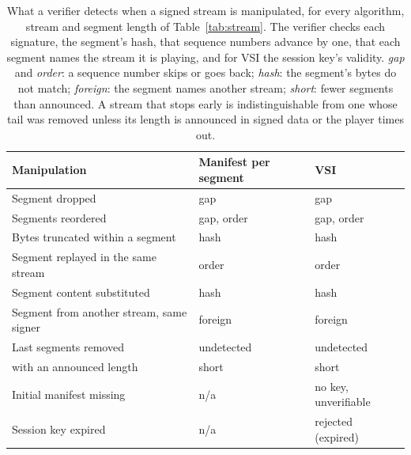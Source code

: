 \begin{table}[ht]
\caption{What a verifier detects when a signed stream is manipulated, for every algorithm, stream and segment length of Table~\ref{tab:stream}. The verifier checks each signature, the segment's hash, that sequence numbers advance by one, that each segment names the stream it is playing, and for VSI the session key's validity. \emph{gap} and \emph{order}: a sequence number skips or goes back; \emph{hash}: the segment's bytes do not match; \emph{foreign}: the segment names another stream; \emph{short}: fewer segments than announced. A stream that stops early is indistinguishable from one whose tail was removed unless its length is announced in signed data or the player times out.}
\label{tab:streamdetect}
\small
\begin{tabular}{lll}
\toprule
Manipulation & Manifest per segment & VSI\\
\midrule
Segment dropped & gap & gap\\
Segments reordered & gap, order & gap, order\\
Bytes truncated within a segment & hash & hash\\
Segment replayed in the same stream & order & order\\
Segment content substituted & hash & hash\\
Segment from another stream, same signer & foreign & foreign\\
Last segments removed & undetected & undetected\\
\quad with an announced length & short & short\\
Initial manifest missing & n/a & no key, unverifiable\\
Session key expired & n/a & rejected (expired)\\
\bottomrule
\end{tabular}
\end{table}
